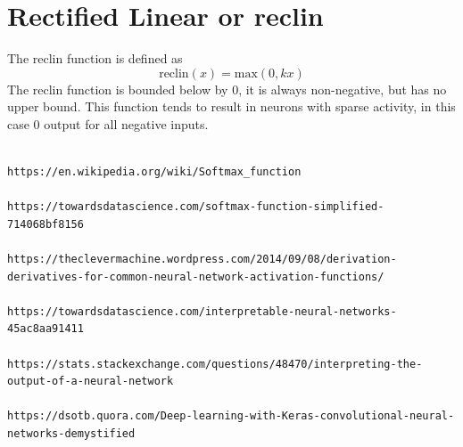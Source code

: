 \section{Rectified Linear or reclin}

The reclin function is defined as 
\begin{equation}
\textrm{reclin}(x) = \textrm{max}(0,kx)
\end{equation}
The reclin function is bounded below by 0, it is always non-negative, but has no upper bound.  This function tends to result in neurons with sparse activity, in this case 0 output for all negative inputs.


\begin{lstlisting}

https://en.wikipedia.org/wiki/Softmax_function

https://towardsdatascience.com/softmax-function-simplified-714068bf8156

https://theclevermachine.wordpress.com/2014/09/08/derivation-derivatives-for-common-neural-network-activation-functions/

https://towardsdatascience.com/interpretable-neural-networks-45ac8aa91411

https://stats.stackexchange.com/questions/48470/interpreting-the-output-of-a-neural-network

https://dsotb.quora.com/Deep-learning-with-Keras-convolutional-neural-networks-demystified
\end{lstlisting}